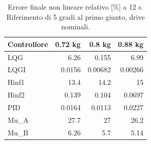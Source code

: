 \begin{table}[htbp]\centering\small
\setlength{\tabcolsep}{4pt}
\begin{tabular}{lrrr}\toprule
Controllore & 0.72 kg & 0.8 kg & 0.88 kg\\\midrule
LQG & \num{6.26} & \num{0.155} & \num{6.99}\\
LQGI & \num{0.0156} & \num{0.00682} & \num{0.00266}\\
Hinf1 & \num{13.4} & \num{14.2} & \num{15}\\
Hinf2 & \num{0.139} & \num{0.104} & \num{0.0697}\\
PID & \num{0.0164} & \num{0.0113} & \num{0.0227}\\
Mu\_A & \num{27.7} & \num{27} & \num{26.2}\\
Mu\_B & \num{6.26} & \num{5.7} & \num{5.14}\\
\bottomrule\end{tabular}
\caption{Errore finale non lineare relativo [\%] a 12 s. Riferimento di 5 gradi al primo giunto, drive nominali.}
\label{tab:tracking-massa}
\end{table}
